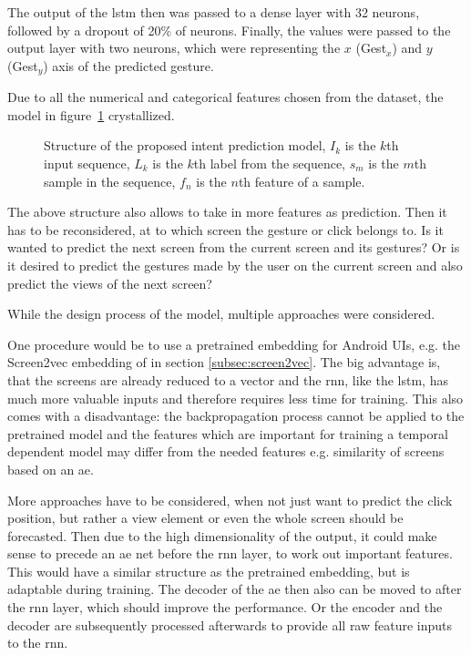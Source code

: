 
The output of the \gls{lstm} then was passed to a dense layer with 32 neurons, followed by a dropout of 20\% of neurons.
Finally, the values were passed to the output layer with two neurons, which were representing the $x$ (Gest$_x$) and $y$ (Gest$_y$) axis of the predicted gesture.

Due to all the numerical and categorical features chosen from the dataset, the model  in figure~\ref{fig:model-structure} crystallized.

\begin{figure}[htbp!]
  \centering
  \makebox[\textwidth][c]{}
  \caption[Structure of user intent prediction model]{Structure of the proposed intent prediction model, $I_k$ is the $k$th input sequence, $L_k$ is the $k$th label from the sequence, $s_m$ is the $m$th sample in the sequence, $f_n$ is the $n$th feature of a sample.}
  \label{fig:model-structure}
\end{figure}

The above structure also allows to take in more features as prediction.
Then it has to be reconsidered, at to which screen the gesture or click belongs to.
Is it wanted to predict the next screen from the current screen and its gestures?
Or is it desired to predict the gestures made by the user on the current screen and also predict the views of the next screen?

While the design process of the model, multiple approaches were considered.

One procedure would be to use a pretrained embedding for Android UIs, e.g. the Screen2vec embedding of \cite{li2021screen2vec} in section \ref{subsec:screen2vec}.
The big advantage is, that the screens are already reduced to a vector and the \gls{rnn}, like the \gls{lstm}, has much more valuable inputs and therefore requires less time for training.
This also comes with a disadvantage: the backpropagation process cannot be applied to the pretrained model and the features which are important for training a temporal dependent model may differ from the needed features e.g. similarity of screens based on an \gls{ae}.

More approaches have to be considered, when not just want to predict the click position, but rather a view element or even the whole screen should be forecasted.
Then due to the high dimensionality of the output, it could make sense to precede an \gls{ae} net before the \gls{rnn} layer, to work out important features.
This would have a similar structure as the pretrained embedding, but is adaptable during training.
The decoder of the \gls{ae} then also can be moved to after the \gls{rnn} layer, which should improve the performance.
Or the encoder and the decoder are subsequently processed afterwards to provide all raw feature inputs to the \gls{rnn}.

